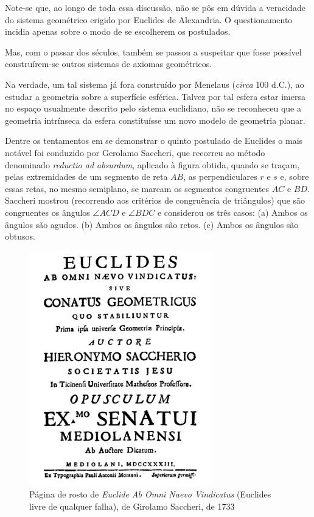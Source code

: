 \documentclass{hipatia}
\begin{document}
Note-se que, ao longo de toda essa discussão, não se pôs em dúvida a veracidade do sistema geométrico erigido por Euclides de Alexandria. O questionamento incidia apenas sobre o modo de se escolherem os postulados. 

Mas, com o passar dos séculos, também se passou a suspeitar que fosse possível construírem-se outros sistemas de axiomas geométricos. 

Na verdade, um tal sistema já fora construído por Menelaus (\emph{circa} 100 d.C.), ao estudar a geometria sobre a superfície esférica. Talvez por tal esfera estar imersa no espaço usualmente descrito pelo sistema euclidiano, não se reconheceu que a geometria intrínseca da esfera constituísse um novo modelo de geometria planar.  \cite[p. 57]{struik1987} 

Dentre os tentamentos em se demonstrar o quinto postulado de Euclides o mais notável foi conduzido por Gerolamo Saccheri, que recorreu ao método denominado \emph{reductio ad absurdum}, aplicado à figura obtida, quando se traçam, pelas extremidades de um segmento de reta $AB$, as perpendiculares $r$ e $s$ e, sobre essas retas, no mesmo semiplano, se marcam os segmentos congruentes $AC$ e $BD$. Saccheri mostrou (recorrendo aos critérios de congruência de triângulos) que são congruentes os ângulos $\angle ACD$ e $\angle BDC$ e considerou os três casos: 
(a)  Ambos os ângulos são agudos. 
(b)  Ambos os ângulos são retos. 
(c)  Ambos os ângulos são obtusos.

\begin{figure}[htb!]
    \includegraphics[width=8cm]{Saccheri.jpg}
 \caption*{Página de rosto de \emph{Euclide Ab Omni Naevo Vindicatus} (Euclides livre de qualquer falha), de Girolamo Saccheri, de 1733}   
\end{figure}
\end{document}
